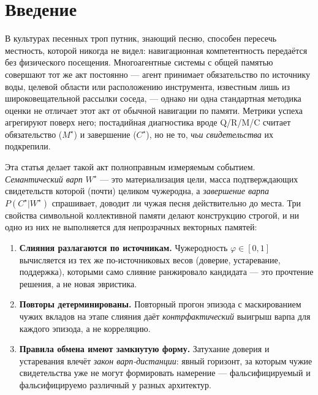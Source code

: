 \documentclass{article}
\newcommand{\wstar}{W^{\star}}
\newcommand{\mstar}{M^{\star}}
\newcommand{\cstar}{C^{\star}}
\begin{document}
\section{Введение}
\label{sec:intro}

В культурах песенных троп путник, знающий песню, способен пересечь
местность, которой никогда не видел: навигационная компетентность
передаётся без физического посещения. Многоагентные системы с общей
памятью совершают тот же акт постоянно --- агент принимает
обязательство по источнику воды, целевой области или расположению
инструмента, известным лишь из широковещательной рассылки соседа, ---
однако ни одна стандартная методика оценки не отличает этот акт от
обычной навигации по памяти. Метрики успеха агрегируют поверх него;
постадийная диагностика вроде Q/R/M/C считает обязательство
($\mstar$) и завершение ($\cstar$), но не то, \emph{чьи свидетельства}
их подкрепили.

Эта статья делает такой акт полноправным измеряемым событием.
\emph{Семантический варп} $\wstar$ --- это материализация цели, масса
подтверждающих свидетельств которой (почти) целиком чужеродна, а
\emph{завершение варпа} $P(\cstar|\wstar)$ спрашивает, доводит ли
чужая песня действительно до места. Три свойства символьной
коллективной памяти делают конструкцию строгой, и ни одно из них не
выполняется для непрозрачных векторных памятей:

\begin{enumerate}[leftmargin=20pt,itemsep=2pt,topsep=2pt]
\item \textbf{Слияния разлагаются по источникам.} Чужеродность
  $\varphi\in[0,1]$ вычисляется из тех же по-источниковых весов
  (доверие, устаревание, поддержка), которыми само слияние
  ранжировало кандидата --- это прочтение решения, а не новая
  эвристика.
\item \textbf{Повторы детерминированы.} Повторный прогон эпизода с
  маскированием чужих вкладов на этапе слияния даёт
  \emph{контрфактический} выигрыш варпа для каждого эпизода, а не
  корреляцию.
\item \textbf{Правила обмена имеют замкнутую форму.} Затухание
  доверия и устаревания влечёт \emph{закон варп-дистанции}: явный
  горизонт, за которым чужие свидетельства уже не могут формировать
  намерение --- фальсифицируемый и фальсифицируемо различный у разных
  архитектур.
\end{enumerate}
\end{document}
